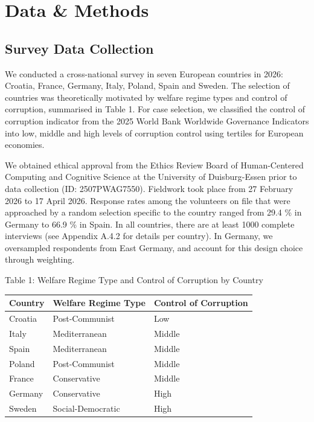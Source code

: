 \documentclass[12pt]{article}
\begin{document}
\section{Data \& Methods}\label{data-methods}

\subsection{Survey Data Collection}\label{survey-data-collection}

We conducted a cross-national survey in seven European countries in
2026: Croatia, France, Germany, Italy, Poland, Spain and Sweden. The
selection of countries was theoretically motivated by welfare regime
types and control of corruption, summarised in Table 1. For case
selection, we classified the control of corruption indicator from the
2025 World Bank Worldwide Governance Indicators into low, middle and
high levels of corruption control using tertiles for European economies.

We obtained ethical approval from the Ethics Review Board of
Human-Centered Computing and Cognitive Science at the University of
Duisburg-Essen prior to data collection (ID: 2507PWAG7550). Fieldwork
took place from 27 February 2026 to 17 April 2026. Response rates among
the volunteers on file that were approached by a random selection
specific to the country ranged from 29.4 \% in Germany to 66.9 \% in
Spain. In all countries, there are at least 1000 complete interviews
(see Appendix A.4.2 for details per country). In Germany, we oversampled
respondents from East Germany, and account for this design choice
through weighting.

Table 1: Welfare Regime Type and Control of Corruption by Country

\begin{longtable}[]{@{}
  >{\raggedright\arraybackslash}p{}
  >{\raggedright\arraybackslash}p{}
  >{\raggedright\arraybackslash}p{}@{}}
\toprule\noalign{}
\begin{minipage}[b]{\linewidth}\raggedright
Country
\end{minipage} & \begin{minipage}[b]{\linewidth}\raggedright
Welfare Regime Type
\end{minipage} & \begin{minipage}[b]{\linewidth}\raggedright
Control of Corruption
\end{minipage} \\
\midrule\noalign{}
\endhead
\bottomrule\noalign{}
\endlastfoot
Croatia & Post-Communist & Low \\
Italy & Mediterranean & Middle \\
Spain & Mediterranean & Middle \\
Poland & Post-Communist & Middle \\
France & Conservative & Middle \\
Germany & Conservative & High \\
Sweden & Social-Democratic & High \\
\end{longtable}
\end{document}
